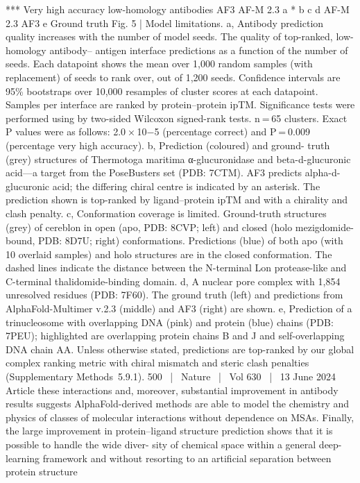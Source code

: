 ***
Very high accuracy
low-homology antibodies
AF3
AF-M 2.3
a
*
b
c
d
AF-M 2.3
AF3
e
Ground truth
Fig. 5 | Model limitations. a, Antibody prediction quality increases with the
number of model seeds. The quality of top-ranked, low-homology antibody–
antigen interface predictions as a function of the number of seeds. Each
datapoint shows the mean over 1,000 random samples (with replacement) of
seeds to rank over, out of 1,200 seeds. Confidence intervals are 95\% bootstraps
over 10,000 resamples of cluster scores at each datapoint. Samples per
interface are ranked by protein–protein ipTM. Significance tests were
performed using by two-sided Wilcoxon signed-rank tests. n = 65 clusters.
Exact P values were as follows: 2.0 × 10−5 (percentage correct) and P = 0.009
(percentage very high accuracy). b, Prediction (coloured) and ground-
truth (grey) structures of Thermotoga maritima α-glucuronidase and
beta-d-glucuronic acid—a target from the PoseBusters set (PDB: 7CTM). AF3
predicts alpha-d-glucuronic acid; the differing chiral centre is indicated by an
asterisk. The prediction shown is top-ranked by ligand–protein ipTM and with a
chirality and clash penalty. c, Conformation coverage is limited. Ground-truth
structures (grey) of cereblon in open (apo, PDB: 8CVP; left) and closed (holo
mezigdomide-bound, PDB: 8D7U; right) conformations. Predictions (blue) of
both apo (with 10 overlaid samples) and holo structures are in the closed
conformation. The dashed lines indicate the distance between the N-terminal
Lon protease-like and C-terminal thalidomide-binding domain. d, A nuclear
pore complex with 1,854 unresolved residues (PDB: 7F60). The ground truth
(left) and predictions from AlphaFold-Multimer v.2.3 (middle) and AF3 (right)
are shown. e, Prediction of a trinucleosome with overlapping DNA (pink) and
protein (blue) chains (PDB: 7PEU); highlighted are overlapping protein chains
B and J and self-overlapping DNA chain AA. Unless otherwise stated, predictions
are top-ranked by our global complex ranking metric with chiral mismatch and
steric clash penalties (Supplementary Methods 5.9.1).
500  |  Nature  |  Vol 630  |  13 June 2024
Article
these interactions and, moreover, substantial improvement in antibody
results suggests AlphaFold-derived methods are able to model the
chemistry and physics of classes of molecular interactions without
dependence on MSAs. Finally, the large improvement in protein–ligand
structure prediction shows that it is possible to handle the wide diver-
sity of chemical space within a general deep-learning framework and
without resorting to an artificial separation between protein structure
